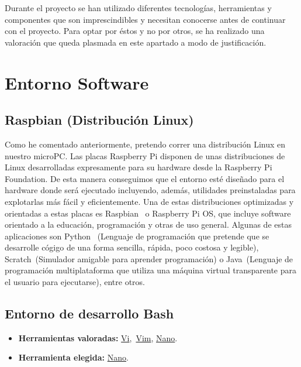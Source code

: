 
Durante el proyecto se han utilizado diferentes tecnologías, herramientas y componentes que son imprescindibles y necesitan conocerse antes de continuar con el proyecto. Para optar por éstos y no por otros, se ha realizado una valoración que queda plasmada en este apartado a modo de justificación.

\section{Entorno Software}
\subsection{Raspbian (Distribución Linux)}\label{4:RaspbianOS}
Como he comentado anteriormente, pretendo correr una distribución Linux en nuestro microPC. Las placas Raspberry Pi disponen de unas distribuciones de Linux desarrolladas expresamente para su hardware desde la Raspberry Pi Foundation. De esta manera conseguimos que el entorno esté diseñado para el hardware donde será ejecutado incluyendo, además, utilidades preinstaladas para explotarlas más fácil y eficientemente. Una de estas distribuciones optimizadas y orientadas a estas placas es Raspbian~\cite{misc:RbPWeb} o Raspberry Pi OS, que incluye software orientado a la educación, programación y otras de uso general. Algunas de estas aplicaciones son Python~\cite{misc:Python} (Lenguaje de programación que pretende que se desarrolle cógigo de una forma sencilla, rápida, poco costosa y legible), Scratch~\cite{misc:Scratch}(Simulador amigable para aprender programación) o Java~\cite{misc:Java}(Lenguaje de programación multiplataforma que utiliza una máquina virtual transparente para el usuario para ejecutarse), entre otros.

\subsection{Entorno de desarrollo Bash}\label{4:BASH}
\begin{itemize}
    \item \textbf{Herramientas valoradas:} \href{https://www.freebsd.org/cgi/man.cgi?query=vi&sektion=1}{Vi},~\href{https://www.vim.org/}{Vim}, \href{https://www.nano-editor.org/}{Nano}.
    \item \textbf{Herramienta elegida:} \href{https://www.nano-editor.org/}{Nano}.
\end{itemize}

